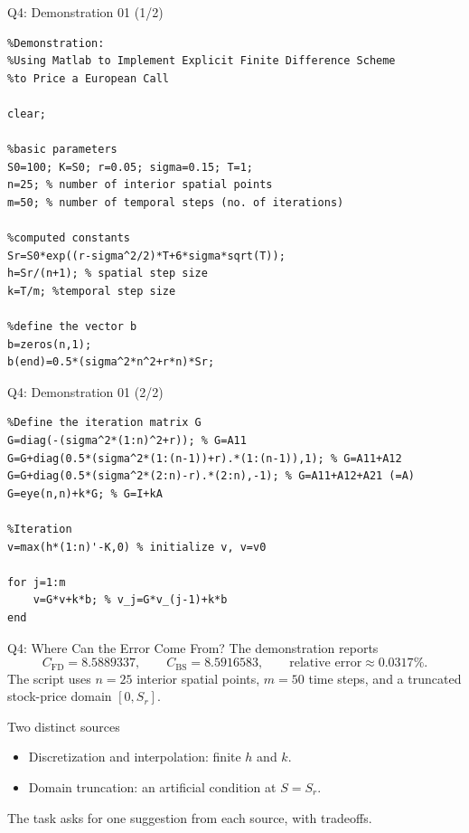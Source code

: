 \documentclass{beamer}
\begin{document}
\begin{frame}[fragile]{Q4: Demonstration 01 (1/2)}
\begin{lstlisting}
%Demonstration:
%Using Matlab to Implement Explicit Finite Difference Scheme
%to Price a European Call

clear;

%basic parameters
S0=100; K=S0; r=0.05; sigma=0.15; T=1;
n=25; % number of interior spatial points
m=50; % number of temporal steps (no. of iterations)

%computed constants
Sr=S0*exp((r-sigma^2/2)*T+6*sigma*sqrt(T));
h=Sr/(n+1); % spatial step size
k=T/m; %temporal step size

%define the vector b
b=zeros(n,1);
b(end)=0.5*(sigma^2*n^2+r*n)*Sr;
\end{lstlisting}
\end{frame}

\begin{frame}[fragile]{Q4: Demonstration 01 (2/2)}
\begin{lstlisting}
%Define the iteration matrix G
G=diag(-(sigma^2*(1:n)^2+r)); % G=A11
G=G+diag(0.5*(sigma^2*(1:(n-1))+r).*(1:(n-1)),1); % G=A11+A12
G=G+diag(0.5*(sigma^2*(2:n)-r).*(2:n),-1); % G=A11+A12+A21 (=A)
G=eye(n,n)+k*G; % G=I+kA

%Iteration
v=max(h*(1:n)'-K,0) % initialize v, v=v0

for j=1:m
    v=G*v+k*b; % v_j=G*v_(j-1)+k*b
end
\end{lstlisting}
\end{frame}

\begin{frame}{Q4: Where Can the Error Come From?}
The demonstration reports
\[
C_{\mathrm{FD}}=8.5889337,
\qquad C_{\mathrm{BS}}=8.5916583,
\qquad\text{relative error}\approx0.0317\%.
\]
The script uses $n=25$ interior spatial points, $m=50$
time steps, and a truncated stock-price domain $[0,S_r]$.

\begin{block}{Two distinct sources}
\begin{itemize}
\item Discretization and interpolation: finite $h$ and $k$.
\item Domain truncation: an artificial condition at $S=S_r$.
\end{itemize}
\end{block}
The task asks for one suggestion from each source, with tradeoffs.
\end{frame}
\end{document}
